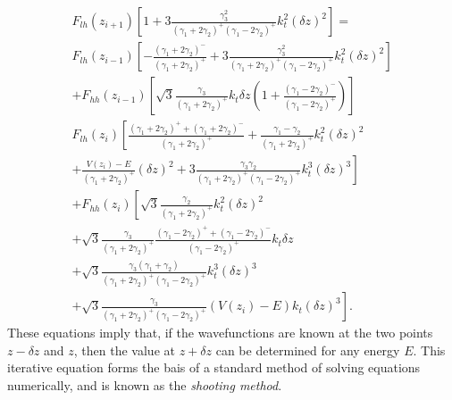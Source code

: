 \begin{multline}
F_{lh}(z_{i+1})\left[1+3\frac{\gamma_{3}^{2}}{\left(\gamma_{1}+2\gamma_{2}\right)^{+}\left(\gamma_{1}-2\gamma_{2}\right)^{+}}k_{t}^{2}(\delta z)^{2}\right]=\\
F_{lh}(z_{i-1})\left[-\frac{\left(\gamma_{1}+2\gamma_{2}\right)^{-}}{\left(\gamma_{1}+2\gamma_{2}\right)^{+}}+3\frac{\gamma_{3}^{2}}{\left(\gamma_{1}+2\gamma_{2}\right)^{+}\left(\gamma_{1}-2\gamma_{2}\right)^{+}}k_{t}^{2}(\delta z)^{2}\right]\\
+F_{hh}(z_{i-1})\left[\sqrt{3}\frac{\gamma_{3}}{\left(\gamma_{1}+2\gamma_{2}\right)^{+}}k_{t}\delta z\left(1+\frac{\left(\gamma_{1}-2\gamma_{2}\right)^{-}}{\left(\gamma_{1}-2\gamma_{2}\right)^{+}}\right)\right]\\
F_{lh}(z_{i})\left[\frac{\left(\gamma_{1}+2\gamma_{2}\right)^{+}+\left(\gamma_{1}+2\gamma_{2}\right)^{-}}{\left(\gamma_{1}+2\gamma_{2}\right)^{+}}+\frac{\gamma_{1}-\gamma_{2}}{\left(\gamma_{1}+2\gamma_{2}\right)^{+}}k_{t}^{2}(\delta z)^{2}\right.\\
+\left.\frac{V(z_{i})-E}{\left(\gamma_{1}+2\gamma_{2}\right)^{+}}(\delta z)^{2}+3\frac{\gamma_{3}\gamma_{2}}{\left(\gamma_{1}+2\gamma_{2}\right)^{+}\left(\gamma_{1}-2\gamma_{2}\right)^{+}}k_{t}^{3}(\delta z)^{3}\right]\\
+F_{hh}(z_{i})\left[\sqrt{3}\frac{\gamma_{2}}{\left(\gamma_{1}+2\gamma_{2}\right)^{+}}k_{t}^{2}(\delta z)^{2}\right.\\
+\sqrt{3}\frac{\gamma_{3}}{\left(\gamma_{1}+2\gamma_{2}\right)^{+}}\frac{\left(\gamma_{1}-2\gamma_{2}\right)^{+}+\left(\gamma_{1}-2\gamma_{2}\right)^{-}}{\left(\gamma_{1}-2\gamma_{2}\right)^{+}}k_{t}\delta z\\
+\sqrt{3}\frac{\gamma_{3}\left(\gamma_{1}+\gamma_{2}\right)}{\left(\gamma_{1}+2\gamma_{2}\right)^{+}\left(\gamma_{1}-2\gamma_{2}\right)^{+}}k_{t}^{3}(\delta z)^{3}\\
\left.+\sqrt{3}\frac{\gamma_{3}}{\left(\gamma_{1}+2\gamma_{2}\right)^{+}\left(\gamma_{1}-2\gamma_{2}\right)^{+}}\left(V(z_{i})-E\right)k_{t}(\delta z)^{3}\right].\end{multline}
These equations imply that, if the wavefunctions are known at the
two points $z-\delta z$ and $z$, then the value at $z+\delta z$
can be determined for any energy $E$. This iterative equation forms
the bais of a standard method of solving equations numerically, and
is known as the \emph{shooting method}.

